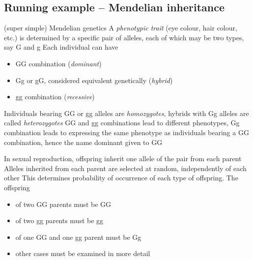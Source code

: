 \documentclass[aspectratio=169]{beamer}\usepackage[]{graphicx}\usepackage[]{xcolor}
\begin{document}
\subsection{Running example -- Mendelian inheritance}


\begin{frame}{(super simple) Mendelian genetics}
A \emph{phenotypic trait} (eye colour, hair colour, etc.) is determined by a specific pair of alleles, each of which may be two types, say G and g
\vfill
Each individual can have
\begin{itemize}
\item GG combination (\emph{dominant})
\item Gg or gG, considered equivalent genetically (\emph{hybrid})
\item gg combination (\emph{recessive})
\end{itemize}
\vfill
Individuals bearing GG or gg alleles are \emph{homozygotes}, hybrids with Gg alleles are called \emph{heterozygotes}
\vfill
GG and gg combinations lead to different phenotypes, Gg combination leads to expressing the same phenotype as individuals bearing a GG combination, hence the name dominant given to GG
\end{frame}

\begin{frame} 
In sexual reproduction, offspring inherit one allele of the pair from each parent
\vfill
Alleles inherited from each parent are selected at random, independently of each other
\vfill
This determines probability of occurrence of each type of offspring. The offspring
\begin{itemize}
\item of two GG parents must be GG
\item of two gg parents must be gg
\item of one GG and one gg parent must be Gg
\item other cases must be examined in more detail
\end{itemize}
\end{frame}
\end{document}
